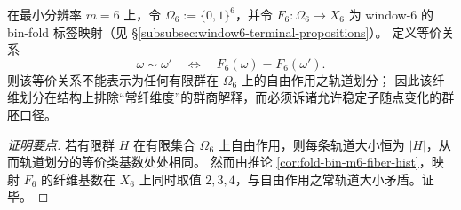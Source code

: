 \begin{conclusion}\label{con:window6-fiber-equivalence-non-group-quotient}
在最小分辨率 \(m=6\) 上，令 \(\Omega_6:=\{0,1\}^6\)，并令
\(
F_6:\Omega_6\to X_6
\)
为 window-\(6\) 的 bin-fold 标签映射（见 \S\ref{subsubsec:window6-terminal-propositions}）。
定义等价关系
\[
\omega\sim\omega'
\quad\Longleftrightarrow\quad
F_6(\omega)=F_6(\omega').
\]
则该等价关系不能表示为任何有限群在 \(\Omega_6\) 上的自由作用之轨道划分；
因此该纤维划分在结构上排除“常纤维度”的群商解释，而必须诉诸允许稳定子随点变化的群胚口径。
\end{conclusion}
\begin{proof}[证明要点]
若有限群 \(H\) 在有限集合 \(\Omega_6\) 上自由作用，则每条轨道大小恒为 \(|H|\)，从而轨道划分的等价类基数处处相同。
然而由推论 \ref{cor:fold-bin-m6-fiber-hist}，映射 \(F_6\) 的纤维基数在 \(X_6\) 上同时取值 \(2,3,4\)，与自由作用之常轨道大小矛盾。证毕。
\end{proof}

